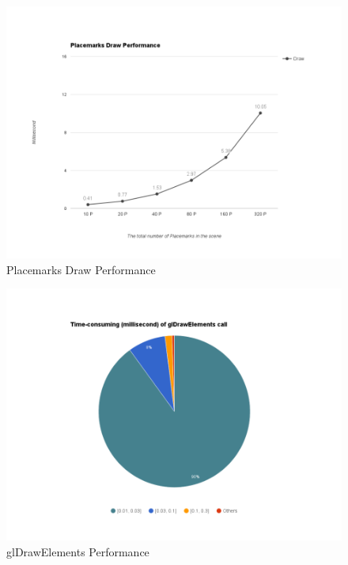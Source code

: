 \begin{figure}[H]
	\caption{Placemarks Draw Performance}
	\label{fig:placemarks-draw-performance}
	\centering
	\includegraphics[width=\textwidth, keepaspectratio]{Figures/placemarks-draw-performance.png}
	\decoRule
\end{figure}



\begin{figure}[H]
	\caption{glDrawElements Performance}
	\label{fig:glDrawElements-performance}
	\centering
	\includegraphics[width=\textwidth, keepaspectratio]{Figures/glDrawElements-performance.png}
	\decoRule
\end{figure}



